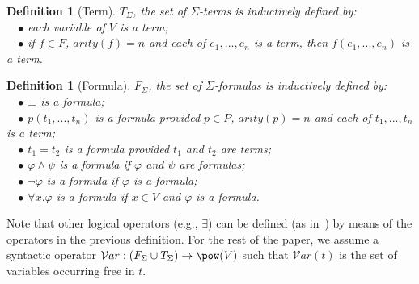 \documentclass[copyright]{eptcs}
\newtheorem{definition}[theorem]{Definition}
\begin{document}
\begin{definition}[Term]
$T_{\Sigma}$, the set of $\Sigma$-terms is inductively defined by:\\
~~$\bullet$ each variable of $V$ is a term;\\
~~$\bullet$ if $f\in F$, $arity(f) = n$ and each of $e_1,...,e_n$ is a term, then $f(e_1,...,e_n)$ is a term.
\end{definition}
\begin{definition}[Formula]
$F_{\Sigma}$, the set of $\Sigma$-formulas is inductively defined by:\\
~~$\bullet$ $\bot$ is a formula;\\
~~$\bullet$ $p(t_1,...,t_n)$ is a formula provided $p\in P$, $arity(p)=n$ and each of $t_1,...,t_n$ is a term;\\
~~$\bullet$ $t_1 = t_2$ is a formula provided $t_1$ and $t_2$ are terms;\\
~~$\bullet$ $\varphi \land \psi$ is a formula if $\varphi$ and $\psi$ are formulas;\\
~~$\bullet$ $\lnot \varphi$ is a formula if $\varphi$ is a formula;\\
~~$\bullet$ $\forall x.\varphi$ is a formula if $x \in V$ and $\varphi$ is a formula.
\end{definition}
Note that other logical operators (e.g., $\exists$) can be defined (as in~\cite{farhad}) by means of the operators in the previous definition. For the rest of the paper, we assume a syntactic operator $\mathcal{V}ar: (F_{\Sigma} \cup T_{\Sigma})\rightarrow \pow(V)$ such that $\mathcal{V}ar(t)$ is the set of variables occurring free in $t$.
\end{document}
